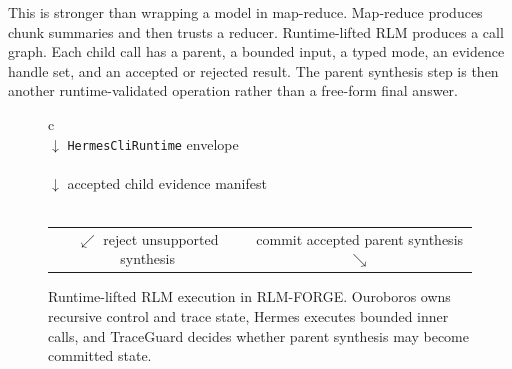 \documentclass[11pt,a4paper]{article}
\begin{document}
This is stronger than wrapping a model in map-reduce. Map-reduce produces
chunk summaries and then trusts a reducer. Runtime-lifted RLM produces a
call graph. Each child call has a parent, a bounded input, a typed mode,
an evidence handle set, and an accepted or rejected result. The parent
synthesis step is then another runtime-validated operation rather than a
free-form final answer.

\begin{figure}[t]
\centering
\small
\setlength{\fboxsep}{6pt}
\begin{tabular}{c}
\\[0.5em]
$\downarrow$ \texttt{HermesCliRuntime} envelope\\[0.4em]
\\[0.5em]
$\downarrow$ accepted child evidence manifest\\[0.4em]
\\[0.5em]
\begin{tabular}{cc}
$\swarrow$ reject unsupported synthesis &
commit accepted parent synthesis $\searrow$
\end{tabular}
\end{tabular}
\caption{Runtime-lifted RLM execution in RLM-FORGE. Ouroboros owns recursive
control and trace state, Hermes executes bounded inner calls, and TraceGuard
decides whether parent synthesis may become committed state.}
\label{fig:architecture}
\end{figure}
\end{document}
